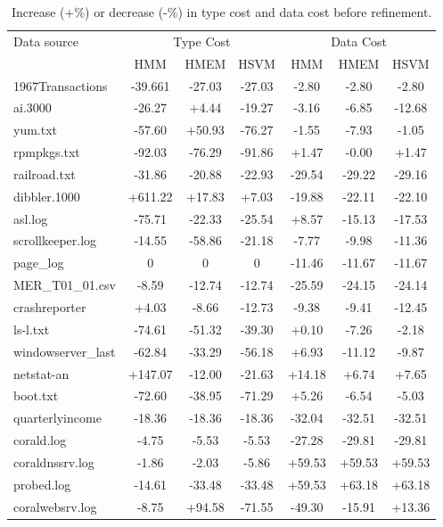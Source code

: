 \begin{table}[t]
\begin{center}
\begin{tabular}{|l||c|c|c||c|c|c|}\hline
Data source & \multicolumn{3}{|c||}{Type Cost} & \multicolumn{3}{|c|}{Data Cost}\\ \cline{2-7} 
& HMM & HMEM & HSVM & HMM & HMEM & HSVM \\ \hline 
1967Transactions & -39.661 & -27.03 & -27.03 & -2.80 & -2.80 & -2.80  \\ \hline
ai.3000 & -26.27 & +4.44 & -19.27 & -3.16 & -6.85 & -12.68            \\ \hline
yum.txt & -57.60 & +50.93 & -76.27 & -1.55 & -7.93 & -1.05            \\ \hline
rpmpkgs.txt & -92.03 & -76.29 & -91.86 & +1.47 & -0.00 & +1.47        \\ \hline
railroad.txt & -31.86 & -20.88 & -22.93 & -29.54 & -29.22 & -29.16    \\ \hline
dibbler.1000 & +611.22 & +17.83 & +7.03 & -19.88 & -22.11 & -22.10    \\ \hline
asl.log & -75.71 & -22.33 & -25.54 & +8.57 & -15.13 & -17.53          \\ \hline
scrollkeeper.log & -14.55 & -58.86 & -21.18 & -7.77 & -9.98 & -11.36  \\ \hline
page\_log & 0 & 0 & 0 & -11.46 & -11.67 & -11.67                      \\ \hline
MER\_T01\_01.csv & -8.59 & -12.74 & -12.74 & -25.59 & -24.15 & -24.14 \\ \hline
crashreporter & +4.03 & -8.66 & -12.73 & -9.38 & -9.41 & -12.45       \\ \hline
ls-l.txt & -74.61 & -51.32 & -39.30 & +0.10 & -7.26 & -2.18           \\ \hline
windowserver\_last & -62.84 & -33.29 & -56.18 & +6.93 & -11.12 & -9.87 \\ \hline
netstat-an & +147.07 & -12.00 & -21.63 & +14.18 & +6.74 & +7.65       \\ \hline
boot.txt & -72.60 & -38.95 & -71.29 & +5.26 & -6.54 & -5.03           \\ \hline
quarterlyincome & -18.36 & -18.36 & -18.36 & -32.04 & -32.51 & -32.51 \\ \hline
corald.log & -4.75 & -5.53 & -5.53 & -27.28 & -29.81 & -29.81         \\ \hline
coraldnssrv.log  & -1.86 & -2.03 & -5.86 & +59.53 & +59.53 & +59.53   \\ \hline
probed.log & -14.61 & -33.48 & -33.48 & +59.53 & +63.18 & +63.18      \\ \hline
coralwebsrv.log & -8.75 & +94.58 & -71.55 & -49.30 & -15.91 & +13.36  \\ \hline
\end{tabular}
\sk
\caption{Increase (+\%) or decrease (-\%) in type cost and data
cost before refinement.} \label{tab:complexity1} \shrink
\end{center}
\end{table}

